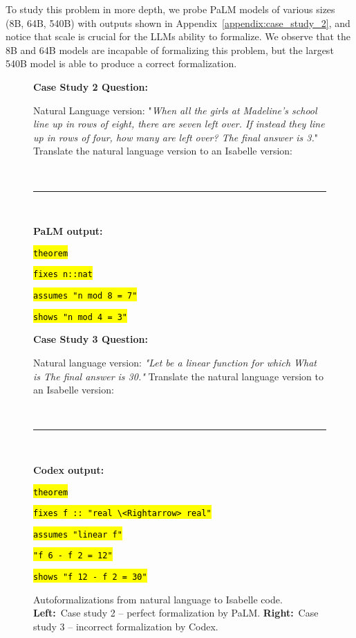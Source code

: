 \documentclass{article}
\begin{document}
To study this problem in more depth, we probe PaLM models of various sizes (8B, 64B, 540B) with outputs shown in Appendix~\ref{appendix:case_study_2}, and notice that scale is crucial for the LLMs ability to formalize. We observe that the 8B and 64B models are incapable of formalizing this problem, but the largest 540B model is able to produce a correct formalization.

\begin{figure}[t!]
\begin{minipage}[c]{0.47\linewidth}
\begin{boxB}
\textbf{Case Study 2 Question:} 

Natural Language version: "\emph{When all the girls at Madeline's school line up in rows of eight, there are seven left over. If instead they line up in rows of four, how many are left over? The final answer is 3.}"
Translate the natural language version to an Isabelle version:



\
\hrule
\

\textbf{PaLM output:} 

\hl{\texttt{theorem}}

  \hspace{10pt} \hl{\texttt{fixes n::nat}}
  
  \hspace{12pt}\hl{\texttt{assumes "n mod 8 = 7"}}
  
  \hspace{12pt}\hl{\texttt{shows "n mod 4 = 3"}}
\end{boxB}

\end{minipage}
\begin{minipage}[c]{0.55\linewidth}
\begin{boxB}
\textbf{Case Study 3 Question:}

Natural language version:
\emph{"Let  be a linear function for which  What is  The final answer is 30."}
Translate the natural language version to an Isabelle version:

\
\hrule
\

\textbf{Codex output:}

\hl{\texttt{theorem}}

  \hspace{10pt} \hl{\texttt{fixes f :: "real \textbackslash<Rightarrow> real"}}
  
  \hspace{12pt}\hl{\texttt{assumes "linear f"}}
  
  \hspace{12pt}\hl{\texttt{\qquad\qquad"f 6 - f 2 = 12"}}
  
  \hspace{12pt}\hl{\texttt{shows "f 12 - f 2 = 30"}}
        
\end{boxB}
\end{minipage}
\caption{Autoformalizations from natural language to Isabelle code. {\bf Left:}~Case study 2 -- perfect formalization by PaLM. {\bf Right:}~Case study 3 -- incorrect formalization by Codex.
}
\label{fig:examples}
\vspace{-10pt}
\end{figure}
\end{document}
